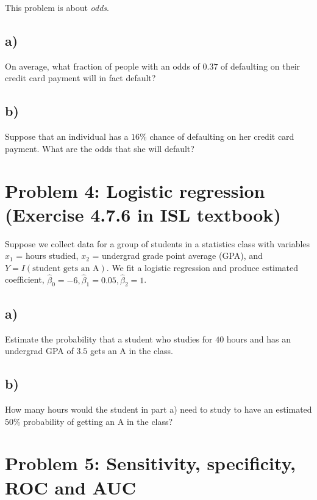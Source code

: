 \documentclass[
]{article}
\begin{document}
This problem is about \emph{odds}.

\subsection{a)}\label{a-2}

On average, what fraction of people with an odds of \(0.37\) of
defaulting on their credit card payment will in fact default?

\subsection{b)}\label{b-2}

Suppose that an individual has a \(16\%\) chance of defaulting on her
credit card payment. What are the odds that she will default?

\section{Problem 4: Logistic regression (Exercise 4.7.6 in ISL
textbook)}\label{problem-4-logistic-regression-exercise-4.7.6-in-isl-textbook}

Suppose we collect data for a group of students in a statistics class
with variables \(x_1\) = hours studied, \(x_2\) = undergrad grade point
average (GPA), and \(Y = I(\text{student gets an A})\). We fit a
logistic regression and produce estimated coefficient,
\(\hat{\beta}_0 = -6, \hat{\beta}_1 = 0.05, \hat{\beta}_2 = 1\).

\subsection{a)}\label{a-3}

Estimate the probability that a student who studies for \(40\) hours and
has an undergrad GPA of \(3.5\) gets an A in the class.

\subsection{b)}\label{b-3}

How many hours would the student in part a) need to study to have an
estimated \(50\%\) probability of getting an A in the class?

\section{Problem 5: Sensitivity, specificity, ROC and
AUC}\label{problem-5-sensitivity-specificity-roc-and-auc}
\end{document}
